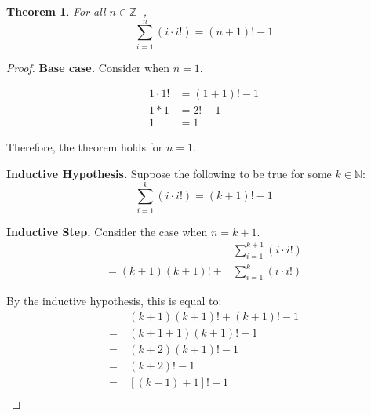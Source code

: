 \documentclass{article}
\newtheorem{theorem}{Theorem}
\numberwithin{subcase}{case}
\begin{document}
\begin{outline}[enumerate]
    \1 \begin{theorem}
        For all $n \in \mathbb{Z}^+$,
        \begin{equation}
            \sum\limits^{n}_{i=1} (i\cdot i!) = (n + 1)! - 1
            \label{eqn:thmfactorial}
        \end{equation}
    \end{theorem}

    \begin{proof}
        \textbf{Base case.} Consider when $n = 1$.

        \begin{equation}
            \begin{aligned}
                1\cdot 1! &= (1 + 1)! - 1 \\
                1 * 1 &= 2! - 1 \\
                1 &= 1
            \end{aligned}
        \end{equation}

        Therefore, the theorem holds for $n = 1$.

        \textbf{Inductive Hypothesis.} Suppose the following to be true for some $k \in \mathbb{N}$:
        \begin{equation}
            \sum\limits^{k}_{i=1} (i\cdot i!) = (k + 1)! - 1
        \end{equation}

        \textbf{Inductive Step.} Consider the case when $n = k + 1$.
        \begin{equation}
            \begin{aligned}
                &\sum\limits^{k+1}_{i=1} (i\cdot i!) \\
                = (k+1)(k+1)! + &\sum\limits^{k}_{i=1} (i\cdot i!)
            \end{aligned}
        \end{equation}

        By the inductive hypothesis, this is equal to:
        \begin{equation}
            \begin{aligned}
                &\ (k+1)(k+1)! + (k + 1)! - 1 \\ 
                =&\ (k + 1 + 1)(k + 1)! - 1  \\
                =&\ (k + 2)(k + 1)! - 1  \\
                =&\ (k + 2)! - 1  \\
                =&\ [(k + 1) + 1]! - 1  \\
            \end{aligned}
        \end{equation}


\end{proof}
\end{outline}
\end{document}
